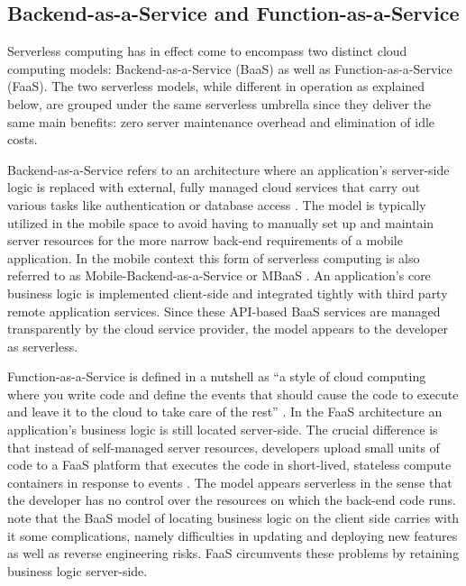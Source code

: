 \subsection{Backend-as-a-Service and Function-as-a-Service} \label{subsec:faasbaas}

Serverless computing has in effect come to encompass two distinct cloud computing models: Backend-as-a-Service (BaaS) as well as Function-as-a-Service (FaaS). The two serverless models, while different in operation as explained below, are grouped under the same serverless umbrella since they deliver the same main benefits: zero server maintenance overhead and elimination of idle costs. \parencite{cncf18serverlessWG}

Backend-as-a-Service refers to an architecture where an application's server-side logic is replaced with external, fully managed cloud services that carry out various tasks like authentication or database access \parencite{buyya2017manifesto}. The model is typically utilized in the mobile space to avoid having to manually set up and maintain server resources for the more narrow back-end requirements of a mobile application. In the mobile context this form of serverless computing is also referred to as Mobile-Backend-as-a-Service or MBaaS \parencite{sareen13cloudTypes}. An application's core business logic is implemented client-side and integrated tightly with third party remote application services. Since these API-based BaaS services are managed transparently by the cloud service provider, the model appears to the developer as serverless.

Function-as-a-Service is defined in a nutshell as ``a style of cloud computing where you write code and define the events that should cause the code to execute and leave it to the cloud to take care of the rest'' \parencite{gannon17cloudNative}. In the FaaS architecture an application's business logic is still located server-side. The crucial difference is that instead of self-managed server resources, developers upload small units of code to a FaaS platform that executes the code in short-lived, stateless compute containers in response to events \parencite{robert2016serverlessarchitectures}. The model appears serverless in the sense that the developer has no control over the resources on which the back-end code runs. \textcite{albuquerque17faaspaas} note that the BaaS model of locating business logic on the client side carries with it some complications, namely difficulties in updating and deploying new features as well as reverse engineering risks. FaaS circumvents these problems by retaining business logic server-side.

